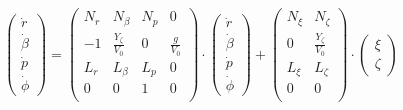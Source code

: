 \begin{equation}\label{eq:seitenbewegung}
	\begin{pmatrix}
		\dot{r}\\
		\dot{\beta}\\
		\dot{p}\\
		\dot{\phi}
	\end{pmatrix} = 
	\begin{pmatrix}
		N_r & N_\beta             & N_p & 0\\
		-1  & \frac{Y_\zeta}{V_0} & 0   & \frac{g}{V_0}\\
		L_r & L_\beta             & L_p & 0\\
		0   & 0                   & 1   & 0\\
	\end{pmatrix} \cdot
	\begin{pmatrix}
		\dot{r}\\
		\dot{\beta}\\
		\dot{p}\\
		\dot{\phi}
	\end{pmatrix} + 
	\begin{pmatrix}
		N_\xi & N_\zeta\\
		0 & \frac{Y_\zeta}{V_0}\\
		L_\xi & L_\zeta\\
		0 & 0\\
	\end{pmatrix}\cdot
	\begin{pmatrix}
		\xi\\
		\zeta
	\end{pmatrix}
\end{equation}

